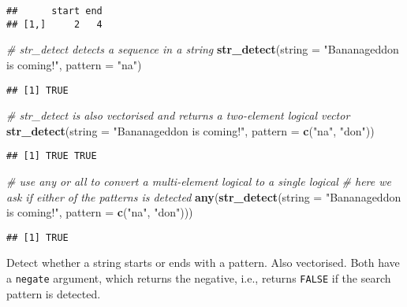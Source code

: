 \documentclass[
]{book}
\newenvironment{Shaded}{}{}
\newcommand{\CommentTok}[1]{\textcolor[rgb]{0.38,0.63,0.69}{\textit{#1}}}
\newcommand{\DataTypeTok}[1]{\textcolor[rgb]{0.56,0.13,0.00}{#1}}
\newcommand{\KeywordTok}[1]{\textcolor[rgb]{0.00,0.44,0.13}{\textbf{#1}}}
\newcommand{\NormalTok}[1]{#1}
\newcommand{\StringTok}[1]{\textcolor[rgb]{0.25,0.44,0.63}{#1}}
\begin{document}
\begin{verbatim}
##      start end
## [1,]     2   4
\end{verbatim}

\begin{Shaded}
\begin{Highlighting}[]
\CommentTok{# str_detect detects a sequence in a string}
\KeywordTok{str_detect}\NormalTok{(}\DataTypeTok{string =} \StringTok{"Bananageddon is coming!"}\NormalTok{,}
           \DataTypeTok{pattern =} \StringTok{"na"}\NormalTok{)}
\end{Highlighting}
\end{Shaded}

\begin{verbatim}
## [1] TRUE
\end{verbatim}

\begin{Shaded}
\begin{Highlighting}[]
\CommentTok{# str_detect is also vectorised and returns a two-element logical vector}
\KeywordTok{str_detect}\NormalTok{(}\DataTypeTok{string =} \StringTok{"Bananageddon is coming!"}\NormalTok{,}
           \DataTypeTok{pattern =} \KeywordTok{c}\NormalTok{(}\StringTok{"na"}\NormalTok{, }\StringTok{"don"}\NormalTok{))}
\end{Highlighting}
\end{Shaded}

\begin{verbatim}
## [1] TRUE TRUE
\end{verbatim}

\begin{Shaded}
\begin{Highlighting}[]
\CommentTok{# use any or all to convert a multi-element logical to a single logical}
\CommentTok{# here we ask if either of the patterns is detected}
\KeywordTok{any}\NormalTok{(}\KeywordTok{str_detect}\NormalTok{(}\DataTypeTok{string =} \StringTok{"Bananageddon is coming!"}\NormalTok{,}
               \DataTypeTok{pattern =} \KeywordTok{c}\NormalTok{(}\StringTok{"na"}\NormalTok{, }\StringTok{"don"}\NormalTok{)))}
\end{Highlighting}
\end{Shaded}

\begin{verbatim}
## [1] TRUE
\end{verbatim}

Detect whether a string starts or ends with a pattern. Also vectorised.
Both have a \texttt{negate} argument, which returns the negative, i.e., returns \texttt{FALSE} if the search pattern is detected.
\end{document}
